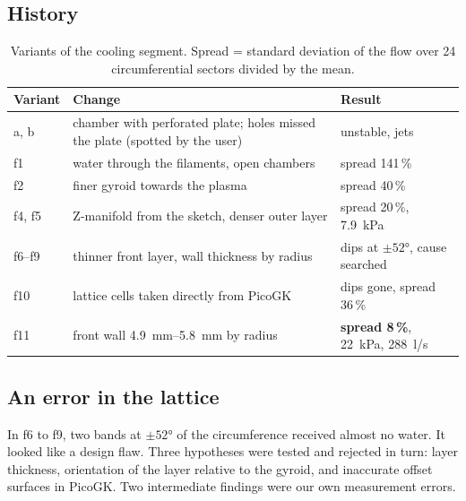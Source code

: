 \documentclass[10pt,a4paper]{article}
\begin{document}
\subsection{History}
\begin{table}[H]\centering\small
\begin{tabularx}{\linewidth}{@{}lXl@{}}\toprule
Variant & Change & Result \\\midrule
a, b & chamber with perforated plate; holes missed the plate (spotted by the user) & unstable, jets \\
f1 & water through the filaments, open chambers & spread 141\,\% \\
f2 & finer gyroid towards the plasma & spread 40\,\% \\
f4, f5 & Z-manifold from the sketch, denser outer layer & spread 20\,\%, \SI{7.9}{kPa} \\
f6--f9 & thinner front layer, wall thickness by radius & dips at $\pm\ang{52}$, cause searched \\
f10 & lattice cells taken directly from PicoGK & dips gone, spread 36\,\% \\
f11 & front wall \SIrange{4.9}{5.8}{mm} by radius & \textbf{spread 8\,\%}, \SI{22}{kPa}, \SI{288}{l/s} \\\bottomrule
\end{tabularx}\caption{Variants of the cooling segment. Spread = standard deviation of the flow over 24
circumferential sectors divided by the mean.}\end{table}

\subsection{An error in the lattice}
In f6 to f9, two bands at $\pm\ang{52}$ of the circumference received almost no water. It looked like a design
flaw. Three hypotheses were tested and rejected in turn: layer thickness, orientation of the layer relative to
the gyroid, and inaccurate offset surfaces in PicoGK. Two intermediate findings were our own measurement errors.
\end{document}
